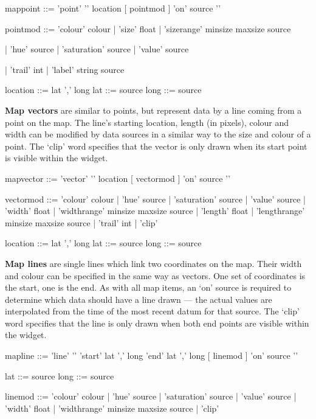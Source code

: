 \begin{v}
mappoint    ::= 'point' '{' location [{ pointmod }] 'on' source '}'

pointmod    ::= 'colour' colour
            |   'size' float
            |   'sizerange' minsize maxsize source

            |   'hue' source
            |   'saturation' source
            |   'value' source

            |   'trail' int
            |   'label' string source

location    ::= lat ',' long
lat         ::= source
long        ::= source
\end{v}

\textbf{Map vectors} are similar to points, but represent data
by a line coming from a point on the map. The line's starting location,
length (in pixels), colour and width can be modified by data sources
in a similar way to the size and colour of a point. The `clip' word specifies
that the vector is only drawn when its start point is visible within the widget.

\begin{v}
mapvector    ::= 'vector' '{' location [{ vectormod }] 'on' source '}'

vectormod    ::= 'colour' colour
            |   'hue' source
            |   'saturation' source
            |   'value' source
            |   'width' float
            |   'widthrange' minsize maxsize source
            |   'length' float
            |   'lengthrange' minsize maxsize source
            |   'trail' int
            |   'clip'

location    ::= lat ',' long
lat         ::= source
long        ::= source
\end{v}

\textbf{Map lines} are single lines which link two coordinates on the map.
Their width and colour can be specified in the same way as vectors.
One set of coordinates is the start, one is the end. As with all map items, an `on'
source is required to determine which data should have a line drawn --- the actual values
are interpolated from the time of the most recent datum for that source. The `clip' word specifies
that the line is only drawn when both end points are visible within the widget.

\begin{v}
mapline ::=     'line' '{' 
                'start' lat ',' long
                'end' lat ',' long
                [{ linemod }]
                'on' source 
                '}'

lat         ::= source
long        ::= source

linemod     ::= 'colour' colour
            |   'hue' source
            |   'saturation' source
            |   'value' source
            |   'width' float
            |   'widthrange' minsize maxsize source
            |   'clip'
\end{v}

